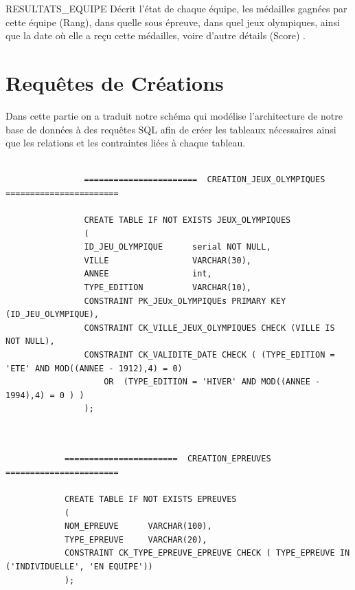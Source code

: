 \documentclass[]{scrreprt}
\begin{document}
			\vspace{0.5cm}
			
			\begin{mytheo}{RESULTATS\_EQUIPE}{}
				Décrit l'état de chaque équipe, les médailles gagnées par cette équipe (Rang), dans quelle sous épreuve, dans quel jeux olympiques, ainsi que la date où elle a reçu cette médailles, voire d'autre détails (Score) .
			\end{mytheo}
			
			\vspace{0.5cm}
		
		
		
		\section{Requêtes de Créations}

			
			{\large Dans cette partie on a traduit notre schéma qui modélise l’architecture de notre base de données à des requêtes SQL afin de créer les tableaux nécessaires ainsi que les relations et les contraintes liées à chaque tableau.}
			
			{\footnotesize 
				\begin{verbatim}
			
				=======================  CREATION_JEUX_OLYMPIQUES  =======================
				
				CREATE TABLE IF NOT EXISTS JEUX_OLYMPIQUES
				(
				ID_JEU_OLYMPIQUE      serial NOT NULL,
				VILLE                 VARCHAR(30),
				ANNEE                 int,
				TYPE_EDITION          VARCHAR(10),
				CONSTRAINT PK_JEUx_OLYMPIQUEs PRIMARY KEY (ID_JEU_OLYMPIQUE),
				CONSTRAINT CK_VILLE_JEUX_OLYMPIQUES CHECK (VILLE IS NOT NULL),
				CONSTRAINT CK_VALIDITE_DATE CHECK ( (TYPE_EDITION = 'ETE' AND MOD((ANNEE - 1912),4) = 0) 
					OR  (TYPE_EDITION = 'HIVER' AND MOD((ANNEE - 1994),4) = 0 ) )
				);
				
				\end{verbatim}}
		
			{\footnotesize 
			\begin{verbatim}
			
			=======================  CREATION_EPREUVES  =======================
			
			CREATE TABLE IF NOT EXISTS EPREUVES
			(
			NOM_EPREUVE      VARCHAR(100),
			TYPE_EPREUVE     VARCHAR(20),
			CONSTRAINT CK_TYPE_EPREUVE_EPREUVE CHECK ( TYPE_EPREUVE IN ('INDIVIDUELLE', 'EN EQUIPE'))
			);
			
			
			
			
			
			
			
				\end{verbatim}}
		
\end{document}
